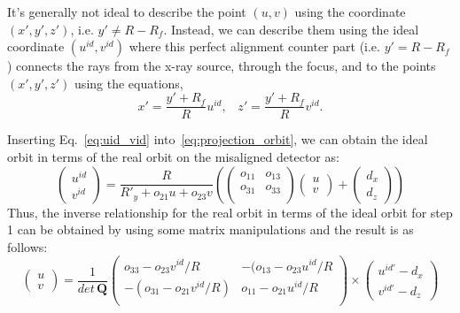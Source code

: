 It's generally not ideal to describe the point $(u, v)$ using the coordinate $(x', y', z')$, i.e. $y' \neq R - R_f$.  Instead, we can describe them using the ideal coordinate $(u^{id}, v^{id})$ where this perfect alignment counter part (i.e. $y' = R - R_f$) connects the rays from the x-ray source, through the focus, and to the points $(x', y', z')$ using the equations,
\begin{equation}
x' = \frac{y' + R_f}{R} u^{id}, \; \; \; z' = \frac{y' + R_f}{R} v^{id}.
\label{eq:uid_vid}
\end{equation}

\noindent Inserting Eq.~\ref{eq:uid_vid} into~\ref{eq:projection_orbit}, we can obtain the ideal orbit in terms of the real orbit on the misaligned detector as:
\begin{equation}
\begin{pmatrix}
u^{id} \\
v^{id} 
\end{pmatrix} = \frac{R}{R'_y + o_{21}u + o_{23} v} 
\left(
\begin{pmatrix}
o_{11} & o_{13} \\
o_{31} & o_{33} \\
\end{pmatrix} 
\begin{pmatrix}
u \\
v
\end{pmatrix} + 
\begin{pmatrix}
d_x \\
d_z
\end{pmatrix}
\right)
\label{eq:ideal_orbit_matrix}
\end{equation}
\noindent Thus, the inverse relationship for the real orbit in terms of the ideal orbit for step 1 can be obtained by using some matrix manipulations and the result is as follows:
\begin{equation}
\begin{pmatrix}
u \\
v
\end{pmatrix} = \frac{1}{det \, \mathrm{\mathbf{Q}}}
\begin{pmatrix}
o_{33} - o_{23} v^{id}/R & -(o_{13} - o_{23} u^{id}/R \\
-(o_{31} - o_{21} v^{id}/R) & o_{11} - o_{21} u^{id}/R \\
\end{pmatrix}
\times 
\begin{pmatrix}
u^{id'} - d_x \\
v^{id'} - d_z
\end{pmatrix}
\label{eq:misaligned_orbit_matrix}
\end{equation}
